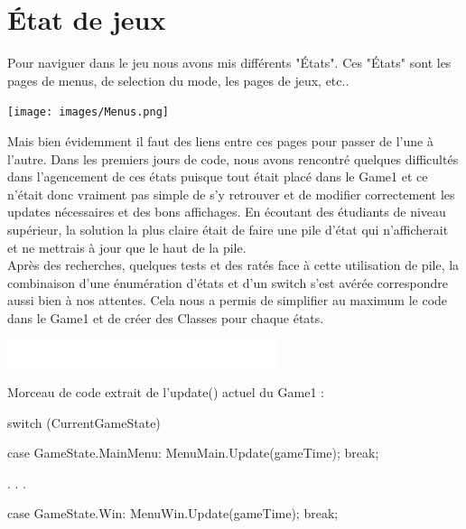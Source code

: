\documentclass [11pt]{report}
\begin{document}
		
		\newpage
		
		
		\section{\'Etat de jeux}
		
		\vspace{5mm}
		
		Pour naviguer dans le jeu nous avons mis différents "États". Ces "États" sont les pages de menus, de selection du mode, les pages de jeux, etc.. 
		
		\vspace{8mm}
		
		\begin{center}
			\texttt{[image: images/Menus.png]}
		\end{center}
		
		
		\vspace{10mm}
			 
			 
		
		Mais bien évidemment il faut des liens entre ces pages pour passer de l'une à l'autre. Dans les premiers jours de code, nous avons rencontré quelques difficultés dans l'agencement de ces états puisque tout était placé dans le Game1 et ce n'était donc vraiment pas simple de s'y retrouver et de modifier correctement les updates nécessaires et des bons affichages. En écoutant des étudiants de niveau supérieur, la solution la plus claire était de faire une pile d'état qui n'afficherait et ne mettrais à jour que le haut de la pile.\\
		
		Après des recherches, quelques tests et des ratés face à cette utilisation de pile, la combinaison d'une énumération d'états et d'un switch s'est avérée correspondre aussi bien à nos attentes. Cela nous a permis de simplifier au maximum le code dans le Game1 et de créer des Classes pour chaque états.\\
				
		\newpage	
			\begin{center}
						\includegraphics[scale = 0.3]{images/blanc.png}
					\end{center}
		\noindent Morceau de code extrait de l'update() actuel du Game1 :
		
		
		\begin{mylisting}
	switch (CurrentGameState)
	{
		case GameState.MainMenu:
			MenuMain.Update(gameTime);
			break;
			
			.
			.
			.
			
		case GameState.Win:
			MenuWin.Update(gameTime);
			break;
	}
				\end{mylisting}
		
\end{document}
